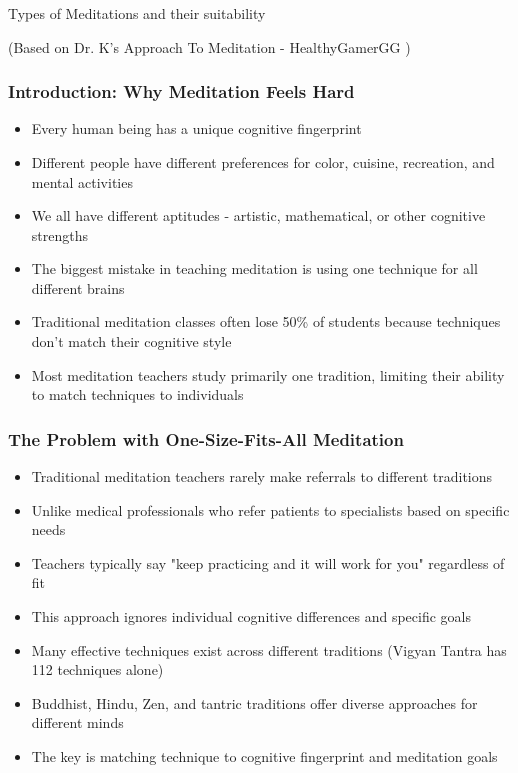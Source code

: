 \begin{frame}[fragile]\frametitle{}
\begin{center}
{\Large Types of Meditations and their suitability}


{\tiny (Based on Dr. K's Approach To Meditation - HealthyGamerGG
)}
\end{center}
\end{frame}

\begin{frame}[fragile]\frametitle{Introduction: Why Meditation Feels Hard}
      \begin{itemize}
	\item Every human being has a unique cognitive fingerprint
	\item Different people have different preferences for color, cuisine, recreation, and mental activities
	\item We all have different aptitudes - artistic, mathematical, or other cognitive strengths
	\item The biggest mistake in teaching meditation is using one technique for all different brains
	\item Traditional meditation classes often lose 50\% of students because techniques don't match their cognitive style
	\item Most meditation teachers study primarily one tradition, limiting their ability to match techniques to individuals
	  \end{itemize}
\end{frame}

\begin{frame}[fragile]\frametitle{The Problem with One-Size-Fits-All Meditation}
      \begin{itemize}
	\item Traditional meditation teachers rarely make referrals to different traditions
	\item Unlike medical professionals who refer patients to specialists based on specific needs
	\item Teachers typically say "keep practicing and it will work for you" regardless of fit
	\item This approach ignores individual cognitive differences and specific goals
	\item Many effective techniques exist across different traditions (Vigyan Tantra has 112 techniques alone)
	\item Buddhist, Hindu, Zen, and tantric traditions offer diverse approaches for different minds
	\item The key is matching technique to cognitive fingerprint and meditation goals
	  \end{itemize}
\end{frame}

